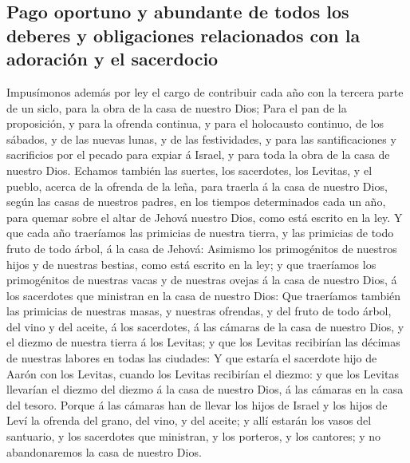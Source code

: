 \hypertarget{pago-oportuno-y-abundante-de-todos-los-deberes-y-obligaciones-relacionados-con-la-adoraciuxf3n-y-el-sacerdocio}{%
\subsection{Pago oportuno y abundante de todos los deberes y
obligaciones relacionados con la adoración y el
sacerdocio}\label{pago-oportuno-y-abundante-de-todos-los-deberes-y-obligaciones-relacionados-con-la-adoraciuxf3n-y-el-sacerdocio}}

 Impusímonos además por ley el cargo de contribuir cada año
con la tercera parte de un siclo, para la obra de la casa de nuestro
Dios;  Para el pan de la proposición, y para la ofrenda
continua, y para el holocausto continuo, de los sábados, y de las nuevas
lunas, y de las festividades, y para las santificaciones y sacrificios
por el pecado para expiar á Israel, y para toda la obra de la casa de
nuestro Dios.  Echamos también las suertes, los sacerdotes,
los Levitas, y el pueblo, acerca de la ofrenda de la leña, para traerla
á la casa de nuestro Dios, según las casas de nuestros padres, en los
tiempos determinados cada un año, para quemar sobre el altar de Jehová
nuestro Dios, como está escrito en la ley.  Y que cada año
traeríamos las primicias de nuestra tierra, y las primicias de todo
fruto de todo árbol, á la casa de Jehová:  Asimismo los
primogénitos de nuestros hijos y de nuestras bestias, como está escrito
en la ley; y que traeríamos los primogénitos de nuestras vacas y de
nuestras ovejas á la casa de nuestro Dios, á los sacerdotes que
ministran en la casa de nuestro Dios:  Que traeríamos
también las primicias de nuestras masas, y nuestras ofrendas, y del
fruto de todo árbol, del vino y del aceite, á los sacerdotes, á las
cámaras de la casa de nuestro Dios, y el diezmo de nuestra tierra á los
Levitas; y que los Levitas recibirían las décimas de nuestras labores en
todas las ciudades:  Y que estaría el sacerdote hijo de
Aarón con los Levitas, cuando los Levitas recibirían el diezmo: y que
los Levitas llevarían el diezmo del diezmo á la casa de nuestro Dios, á
las cámaras en la casa del tesoro.  Porque á las cámaras
han de llevar los hijos de Israel y los hijos de Leví la ofrenda del
grano, del vino, y del aceite; y allí estarán los vasos del santuario, y
los sacerdotes que ministran, y los porteros, y los cantores; y no
abandonaremos la casa de nuestro Dios.

